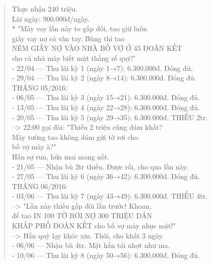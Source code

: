 \documentclass[12pt,a4paper]{article}
\begin{document}
\begin{quote}
          Thực nhận 240 triệu.\\
          Lãi ngày: 900.000đ/ngày.\\
          * "Mày vay lần này to gấp đôi, tao giữ luôn\\
             giấy vay nợ có vân tay. Bùng thì tao\\
             NÉM GIẤY NỢ VÀO NHÀ BỐ VỢ Ở 45 ĐOÀN KẾT\\
             cho cả nhà mày biết mặt thằng rể quý!"\\
\vspace{0.2cm}
- 22/04 --- Thu lãi kỳ 1 (ngày 1→7): 6.300.000đ. Đóng đủ.\\
- 29/04 --- Thu lãi kỳ 2 (ngày 8→14): 6.300.000đ. Đóng đủ.\\
\vspace{0.2cm}
THÁNG 05/2016:\\
- 06/05 --- Thu lãi kỳ 3 (ngày 15→21): 6.300.000đ. Đóng đủ.\\
- 13/05 --- Thu lãi kỳ 4 (ngày 22→28): 6.300.000đ. Đóng đủ.\\
- 20/05 --- Thu lãi kỳ 5 (ngày 29→35): 6.300.000đ. THIẾU 2tr.\\
          --> 22:00 gọi đòi: "Thiếu 2 triệu cũng dám khất?\\
              Mày tưởng tao không dám gửi tờ rơi cho\\
              bố vợ mày à?"\\
              Hắn sợ run, hứa mai mang nốt.\\
- 21/05 --- Nhận bù 2tr thiếu. Được rồi, cho qua lần này.\\
- 27/05 --- Thu lãi kỳ 6 (ngày 36→42): 6.300.000đ. Đóng đủ.\\
\vspace{0.2cm}
THÁNG 06/2016:\\
- 03/06 --- Thu lãi kỳ 7 (ngày 43→49): 6.300.000đ. THIẾU 4tr.\\
          --> "Lần này thiếu gấp đôi lần trước! Khoan,\\
               để tao IN 100 TỜ RƠI NỢ 300 TRIỆU DÁN\\
               KHẮP PHỐ ĐOÀN KẾT cho bố vợ mày nhục mặt!"\\
          --> Hắn quỳ lạy khóc xin. Thôi, cho khất 3 ngày.\\
- 06/06 --- Nhận bù 4tr. Mặt hắn tái nhợt như ma.\\
- 10/06 --- Thu lãi kỳ 8 (ngày 50→56): 6.300.000đ. Đóng đủ.\\
\vspace{0.2cm}

\end{quote}
\end{document}
